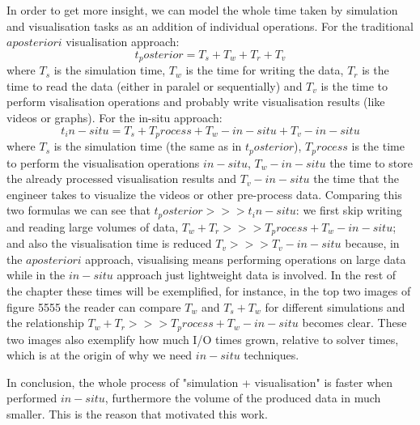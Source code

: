 In order to get more insight, we can model the whole time taken by simulation
and visualisation tasks as an addition of individual operations. For the
traditional $a posteriori$ visualisation approach:
\[
t_posterior = T_s + T_w  + T_r + T_v
\]
where $T_s$ is the simulation time, $T_w$ is the time for writing the data,
$T_r$ is the time to read the data (either in paralel or sequentially) and $T_v$
is the time to perform visalisation operations and probably write visualisation
results (like videos or graphs). For the in-situ approach:
\[
t_in-situ = T_s + T_process + T_w-in-situ + T_v-in-situ
\]
where $T_s$ is the simulation time (the same as in $t_posterior$), $T_process$
is the time to perform the visualisation operations $in-situ$, $T_w-in-situ$ the
time to store the already processed visualisation results and $T_v-in-situ$ the
time that the engineer takes to visualize the videos or other pre-process data.
Comparing this two formulas we can see that $t_posterior >>> t_in-situ$: we
first skip writing and reading large volumes of data, $T_w  + T_r >>> T_process
+ T_w-in-situ$; and also the visualisation time is reduced $T_v >>> T_v-in-situ$
because, in the $a posteriori$ approach, visualising means performing operations
on large data while in the $in-situ$ approach just lightweight data is involved.
In the rest of the chapter these times will be exemplified, for instance, in the
top two images of figure 5555 the reader can compare $T_w$ and $T_s + T_w$ for
different simulations and the relationship $T_w  + T_r >>> T_process +
T_w-in-situ$ becomes clear. These two images also exemplify how much I/O times
grown, relative to solver times, which is at the origin of why we need $in-situ$
techniques.

In conclusion, the whole process of "simulation + visualisation" is faster when
performed $in-situ$, furthermore the volume of the produced data in much
smaller. This is the reason that motivated this work.




